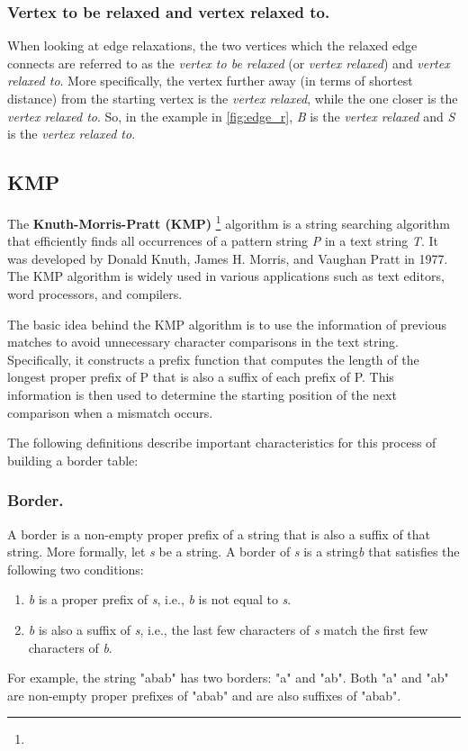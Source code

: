 \documentclass{l4proj}
\begin{document}
\subsubsection{Vertex to be relaxed and vertex relaxed to.}

When looking at edge relaxations, the two vertices which the relaxed edge connects are referred to as the \emph{vertex to be relaxed} (or \emph{vertex relaxed}) and \emph{vertex relaxed to}. More specifically, the vertex further away (in terms of shortest distance) from the starting vertex is the \emph{vertex relaxed}, while the one closer is the \emph{vertex relaxed to}. So, in the example in \autoref{fig:edge_r}, \emph{B} is the \emph{vertex relaxed} and \emph{S} is the \emph{vertex relaxed to}.

\subsection{KMP}

The \textbf{Knuth-Morris-Pratt (KMP)} \footnote{} algorithm is a string searching algorithm that efficiently finds all occurrences of a pattern string \emph{P} in a text string \emph{T}. It was developed by Donald Knuth, James H. Morris, and Vaughan Pratt in 1977. The KMP algorithm is widely used in various applications such as text editors, word processors, and compilers.

The basic idea behind the KMP algorithm is to use the information of previous matches to avoid unnecessary character comparisons in the text string. Specifically, it constructs a prefix function that computes the length of the longest proper prefix of P that is also a suffix of each prefix of P. This information is then used to determine the starting position of the next comparison when a mismatch occurs.



The following definitions describe important characteristics for this process of building a border table:
\subsubsection{Border.}

A border is a non-empty proper prefix of a string that is also a suffix of that string. More formally, let \emph{s} be a string. A border of \emph{s} is a string\emph{b} that satisfies the following two conditions:
\begin{enumerate}
	\item
	\emph{b} is a proper prefix of \emph{s}, i.e., \emph{b} is not equal to \emph{s}.
	\item
	\emph{b} is also a suffix of \emph{s}, i.e., the last few characters of \emph{s} match the first few characters of \emph{b}.
\end{enumerate}
For example, the string "abab" has two borders: "a" and "ab". Both "a" and "ab" are non-empty proper prefixes of "abab" and are also suffixes of "abab".
\end{document}

